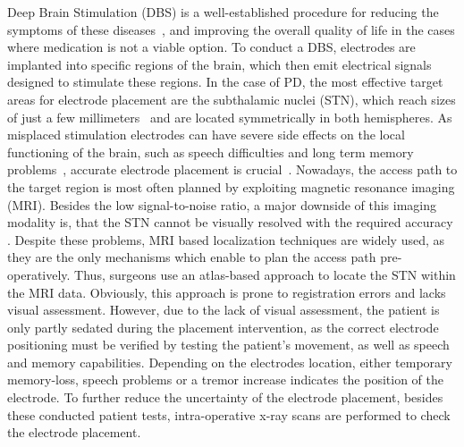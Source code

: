 \documentclass[journal]{vgtc}                %
\begin{document}
Deep Brain Stimulation (DBS) is a well-established procedure for reducing the symptoms of these diseases~\cite{Lindberg2002,Yianni2003,Benabid2009}, and improving the overall quality of life in the cases where medication is not a viable option. To conduct a DBS, electrodes are implanted into specific regions of the brain, which then emit electrical signals designed to stimulate these regions. In the case of PD, the most effective target areas for electrode placement are the subthalamic nuclei (STN), which reach sizes of just a few millimeters~\cite{Richter2004} and are located symmetrically in both hemispheres. As misplaced stimulation electrodes can have severe side effects on the local functioning of the brain, such as speech difficulties and long term memory problems~\cite{Astrom2010}, accurate electrode placement is crucial~\cite{Rodriguez-Oroz2005}. Nowadays, the access path to the target region is most often planned by exploiting magnetic resonance imaging (MRI). Besides the low signal-to-noise ratio, a major downside of this imaging modality is, that the STN cannot be visually resolved with the required accuracy \cite{Starr2002}. Despite these problems, MRI based localization techniques are widely used, as they are the only mechanisms which enable to plan the access path pre-operatively. Thus, surgeons use an atlas-based approach to locate the STN within the MRI data. Obviously, this approach is prone to registration errors and lacks visual assessment. However, due to the lack of visual assessment, the patient is only partly sedated during the placement intervention, as the correct electrode positioning must be verified by testing the patient's movement, as well as speech and memory capabilities. Depending on the electrodes location, either temporary memory-loss, speech problems or a tremor increase indicates the position of the electrode. To further reduce the uncertainty of the electrode placement, besides these conducted patient tests, intra-operative x-ray scans are performed to check the electrode placement.
\end{document}
